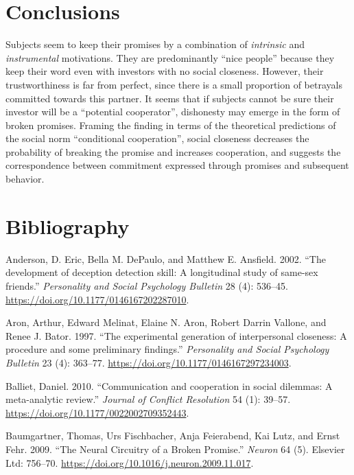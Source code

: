 \documentclass[smallextended]{svjour3}       %
\begin{document}
\hypertarget{conclusions}{%
\section{Conclusions}\label{conclusions}}

Subjects seem to keep their promises by a combination of
\emph{intrinsic} and \emph{instrumental} motivations. They are
predominantly ``nice people'' because they keep their word even with
investors with no social closeness. However, their trustworthiness is
far from perfect, since there is a small proportion of betrayals
committed towards this partner. It seems that if subjects cannot be sure
their investor will be a ``potential cooperator'', dishonesty may emerge
in the form of broken promises. Framing the finding in terms of the
theoretical predictions of the social norm ``conditional cooperation'',
social closeness decreases the probability of breaking the promise and
increases cooperation, and suggests the correspondence between
commitment expressed through promises and subsequent behavior.

\hypertarget{bibliography}{%
\section*{Bibliography}\label{bibliography}}

\hypertarget{refs}{}
\leavevmode\hypertarget{ref-Anderson2002}{}%
Anderson, D. Eric, Bella M. DePaulo, and Matthew E. Ansfield. 2002.
``The development of deception detection skill: A longitudinal study of
same-sex friends.'' \emph{Personality and Social Psychology Bulletin} 28
(4): 536--45. \url{https://doi.org/10.1177/0146167202287010}.

\leavevmode\hypertarget{ref-Aron1997}{}%
Aron, Arthur, Edward Melinat, Elaine N. Aron, Robert Darrin Vallone, and
Renee J. Bator. 1997. ``The experimental generation of interpersonal
closeness: A procedure and some preliminary findings.''
\emph{Personality and Social Psychology Bulletin} 23 (4): 363--77.
\url{https://doi.org/10.1177/0146167297234003}.

\leavevmode\hypertarget{ref-Balliet2010}{}%
Balliet, Daniel. 2010. ``Communication and cooperation in social
dilemmas: A meta-analytic review.'' \emph{Journal of Conflict
Resolution} 54 (1): 39--57.
\url{https://doi.org/10.1177/0022002709352443}.

\leavevmode\hypertarget{ref-Baumgartner2009}{}%
Baumgartner, Thomas, Urs Fischbacher, Anja Feierabend, Kai Lutz, and
Ernst Fehr. 2009. ``The Neural Circuitry of a Broken Promise.''
\emph{Neuron} 64 (5). Elsevier Ltd: 756--70.
\url{https://doi.org/10.1016/j.neuron.2009.11.017}.
\end{document}
